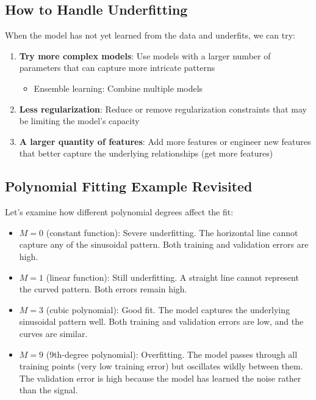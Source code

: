 \documentclass[11pt,a4paper]{article}
\theoremstyle{definition}
\theoremstyle{plain}
\theoremstyle{remark}
\begin{document}
\subsection{How to Handle Underfitting}

When the model has not yet learned from the data and underfits, we can try:

\begin{enumerate}
    \item \textbf{Try more complex models}: Use models with a larger number of parameters that can capture more intricate patterns
    \begin{itemize}
        \item Ensemble learning: Combine multiple models
    \end{itemize}
    
    \item \textbf{Less regularization}: Reduce or remove regularization constraints that may be limiting the model's capacity
    
    \item \textbf{A larger quantity of features}: Add more features or engineer new features that better capture the underlying relationships (get more features)
\end{enumerate}

\subsection{Polynomial Fitting Example Revisited}

Let's examine how different polynomial degrees affect the fit:

\begin{itemize}
    \item \textbf{$M = 0$} (constant function): Severe underfitting. The horizontal line cannot capture any of the sinusoidal pattern. Both training and validation errors are high.
    
    \item \textbf{$M = 1$} (linear function): Still underfitting. A straight line cannot represent the curved pattern. Both errors remain high.
    
    \item \textbf{$M = 3$} (cubic polynomial): Good fit. The model captures the underlying sinusoidal pattern well. Both training and validation errors are low, and the curves are similar.
    
    \item \textbf{$M = 9$} (9th-degree polynomial): Overfitting. The model passes through all training points (very low training error) but oscillates wildly between them. The validation error is high because the model has learned the noise rather than the signal.
\end{itemize}
\end{document}
